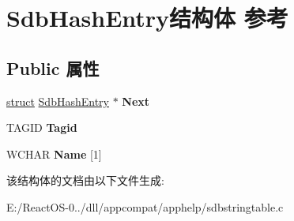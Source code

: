 \hypertarget{struct_sdb_hash_entry}{}\section{Sdb\+Hash\+Entry结构体 参考}
\label{struct_sdb_hash_entry}
\subsection*{Public 属性}
\begin{DoxyCompactItemize}
\item 
\mbox{\label{struct_sdb_hash_entry_aa22fd85e9f1ddb7b8e14b0c15b6942c2}} 
\hyperlink{interfacestruct}{struct} \hyperlink{struct_sdb_hash_entry}{Sdb\+Hash\+Entry} $\ast$ {\bfseries Next}
\item 
\mbox{\label{struct_sdb_hash_entry_a098b4dee326d34452a598077aa90d945}} 
T\+A\+G\+ID {\bfseries Tagid}
\item 
\mbox{\label{struct_sdb_hash_entry_a21e50025ab3f4c182a5d6f0ef3c931a4}} 
W\+C\+H\+AR {\bfseries Name} \mbox{[}1\mbox{]}
\end{DoxyCompactItemize}


该结构体的文档由以下文件生成\+:\begin{DoxyCompactItemize}
\item 
E\+:/\+React\+O\+S-\/0../dll/appcompat/apphelp/sdbstringtable.\+c\end{DoxyCompactItemize}
